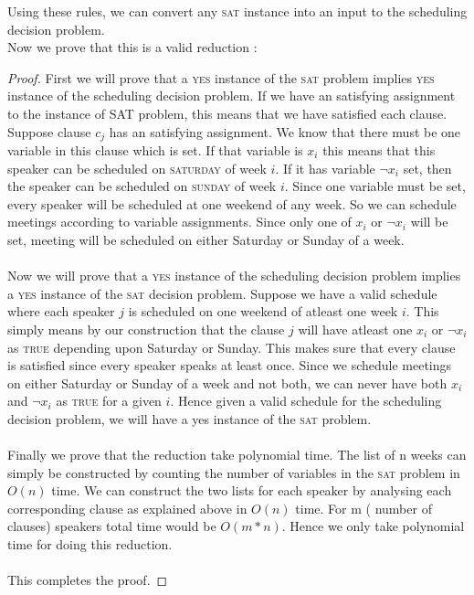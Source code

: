 \documentclass[11pt]{article}
\begin{document}
Using these rules, we can convert any \textsc{sat} instance into an input to the scheduling decision problem. \\
Now we prove that this is a valid reduction :
\begin{proof}
First we will prove that a \textsc{yes} instance of the \textsc{sat} problem implies \textsc{yes} instance of the scheduling decision problem. If we have an satisfying assignment to the instance of SAT problem, this means that we have satisfied each clause. Suppose clause $c_j$ has an satisfying assignment. We know that there must be one variable in this clause which is set. If that variable is $x_i$ this means that this speaker can be scheduled on \textsc{saturday} of week $i$. If it has variable $\neg x_i$ set, then the speaker can be scheduled on \textsc{sunday} of week $i$. Since one variable must be set, every speaker will be scheduled at one weekend of any week. So we can schedule meetings according to variable assignments. Since only one of $x_i$ or $\neg x_i$ will be set, meeting will be scheduled on either Saturday or Sunday of a week. \\\\
Now we will prove that a \textsc{yes} instance of the scheduling decision problem implies a \textsc{yes} instance of the \textsc{sat} decision problem. Suppose we have a valid schedule where each speaker $j$ is scheduled on one weekend of atleast one week $i$. This simply means by our construction that the clause $j$ will have atleast one $x_i$ or $\neg x_i$ as \textsc{true} depending upon Saturday or Sunday. This makes sure that every clause is satisfied since every speaker speaks at least once. Since we schedule meetings on either Saturday or Sunday of a week and not both, we can never have both $x_i$ and $\neg x_i$ as \textsc{true} for a given $i$. Hence given a valid schedule for the scheduling decision problem, we will have a yes instance of the \textsc{sat} problem.\\\\
Finally we prove that the reduction take polynomial time. The list of n weeks can simply be constructed by counting the number of variables in the \textsc{sat} problem in $O(n)$ time. We can construct the two lists for each speaker by analysing each corresponding clause as explained above in $O(n)$ time. For m ( number of clauses) speakers total time would be $O(m*n)$. Hence we only take polynomial time for doing this reduction.\\\\
This completes the proof.
\end{proof}
\end{document}
